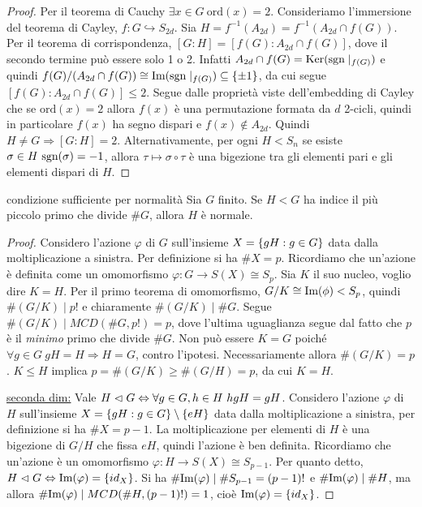 \begin{proof}
    Per il teorema di Cauchy $\exists x \in G \ \text{ord}(x) = 2$. Consideriamo l'immersione del teorema di Cayley, $f: G \hookrightarrow S_{2d}$. Sia $H = f^{-1}(A_{2d}) = f^{-1}(A_{2d} \cap f(G))$. Per il teorema di corrispondenza, $[G : H] = [f(G) : A_{2d} \cap f(G)]$, dove il secondo termine può essere solo 1 o 2. Infatti $A_{2d} \cap f(G) = \text{Ker}(\text{sgn}\mid_{f(G)})$ e quindi $f(G)/(A_{2d} \cap f(G)) \cong \text{Im}(\text{sgn}\mid_{f(G)}) \subseteq\{\pm 1\}$, da cui segue $[f(G) : A_{2d} \cap f(G)] \leq 2$.
    Segue dalle proprietà viste dell'embedding di Cayley che se $\text{ord}(x) = 2$ allora $f(x)$ è una permutazione formata da $d$ 2-cicli, quindi in particolare $f(x)$ ha segno dispari e $f(x) \not \in A_{2d}$. Quindi $H \neq G \Rightarrow [G:H] = 2$.
    Alternativamente, per ogni $H < S_n$ se esiste $\sigma \in H \ \text{sgn}(\sigma) = -1$, allora $\tau \mapsto \sigma \circ \tau$ è una bigezione tra gli elementi pari e gli elementi dispari di $H$.
\end{proof}
\begin{proposition}{condizione sufficiente per normalità}
    Sia $G$ finito. Se $H < G$ ha indice il più piccolo primo che divide $\#G$, allora $H$ è normale.
\end{proposition}
\begin{proof}
    Considero l'azione $\varphi$ di $G$ sull'insieme $X = \left\{ gH : g \in G \right\}$ data dalla moltiplicazione a sinistra. Per definizione si ha $\# X = p $. Ricordiamo che un'azione è definita come un omomorfismo $\varphi: G \rightarrow S(X) \cong S_p$. Sia $K$ il suo nucleo, voglio dire $K = H$. Per il primo teorema di omomorfismo, $G/K \cong \text{Im}(\phi) < S_p$, quindi $\#(G/K) \mid p!$ e chiaramente $\#(G/K) \mid \#G$. Segue $\#(G/K) \mid MCD(\# G, p!) = p$, dove l'ultima uguaglianza segue dal fatto che $p$ è il \textit{minimo} primo che divide $\#G$. Non può essere $K = G$ poiché $\forall g \in G \ gH = H \Rightarrow H = G$, contro l'ipotesi. Necessariamente allora $\#(G/K) = p$. $K \leq H$ implica $p = \#(G/K) \geq \#(G/H) = p$, da cui $K = H$.

    \underline{seconda dim:}
    Vale $H \vartriangleleft G \Leftrightarrow \forall g \in G, h \in H \ hgH = gH$. Considero l'azione $\varphi$ di $H$ sull'insieme $X = \left\{ gH : g \in G \right\} \setminus \{ eH \}$ data dalla moltiplicazione a sinistra, per definizione si ha $\# X = p - 1$.
    La moltiplicazione per elementi di $H$ è una bigezione di $G/H$ che fissa $eH$, quindi l'azione è ben definita. Ricordiamo che un'azione è un omomorfismo $\varphi: H \rightarrow S(X) \cong S_{p-1}$. Per quanto detto, $H \vartriangleleft G \Leftrightarrow \text{Im}(\varphi) = \{ id_X \}$. Si ha $\# \text{Im}(\varphi) \mid \#S_{p-1} = (p-1)!$ e $\# \text{Im}(\varphi) \mid \# H$, ma allora $\#\text{Im}(\varphi) \mid MCD(\#H, (p-1)!) = 1$, cioè $\text{Im}(\varphi) = \{id_X\}$.
\end{proof}
